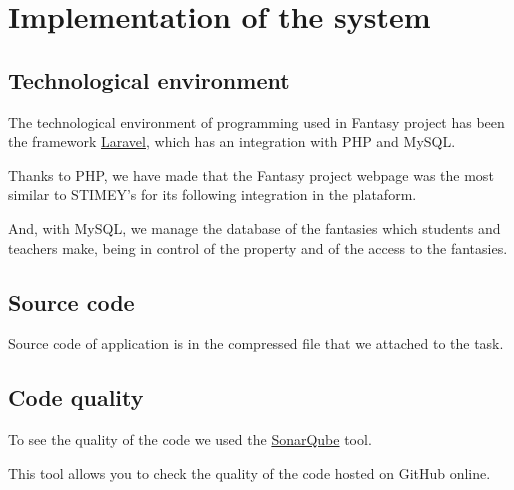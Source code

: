 \chapter{Implementation of the system}
\section{Technological environment}
The technological environment of programming used in Fantasy project has been the framework \href{https://laravel.com/}{Laravel}, which has an integration with PHP and MySQL.

Thanks to PHP, we have made that the Fantasy project webpage was the most similar to STIMEY's for its following integration in the plataform.

And, with MySQL, we manage the database of the fantasies which students and teachers make, being in control of the property and of the access to the fantasies.

\section{Source code}
Source code of application is in the compressed file that we attached to the task.


\section{Code quality}
To see the quality of the code we used the \href{https://www.sonarqube.org/}{SonarQube} tool.

This tool allows you to check the quality of the code hosted on GitHub online.

